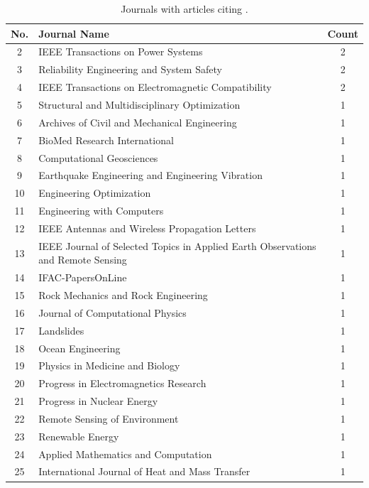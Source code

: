 \documentclass[11pt]{article}
\begin{document}
\begin{table}[!ht]
  \centering
  \caption{Journals with articles citing \uqlab.}
  \label{tab:citing_journals} 
  \begin{tabularx}{\textwidth}{cXc}\toprule
    \textbf{No.} & \textbf{Journal Name} & \textbf{Count} \\\midrule
2 & IEEE Transactions on Power Systems & 2\\
3 & Reliability Engineering and System Safety & 2\\
4 & IEEE Transactions on Electromagnetic Compatibility & 2\\
5 & Structural and Multidisciplinary Optimization & 1\\
6 & Archives of Civil and Mechanical Engineering & 1\\
7 & BioMed Research International & 1\\
8 & Computational Geosciences & 1\\
9 & Earthquake Engineering and Engineering Vibration & 1\\
10 & Engineering Optimization & 1\\
11 & Engineering with Computers & 1\\
12 & IEEE Antennas and Wireless Propagation Letters & 1\\
13 & IEEE Journal of Selected Topics in Applied Earth Observations and Remote Sensing & 1\\
14 & IFAC-PapersOnLine & 1\\
15 & Rock Mechanics and Rock Engineering & 1\\
16 & Journal of Computational Physics & 1\\
17 & Landslides & 1\\
18 & Ocean Engineering & 1\\
19 & Physics in Medicine and Biology & 1\\
20 & Progress in Electromagnetics Research & 1\\
21 & Progress in Nuclear Energy & 1\\
22 & Remote Sensing of Environment & 1\\
23 & Renewable Energy & 1\\
24 & Applied Mathematics and Computation & 1\\
25 & International Journal of Heat and Mass Transfer & 1\\\bottomrule
  \end{tabularx}
\end{table}
\end{document}
